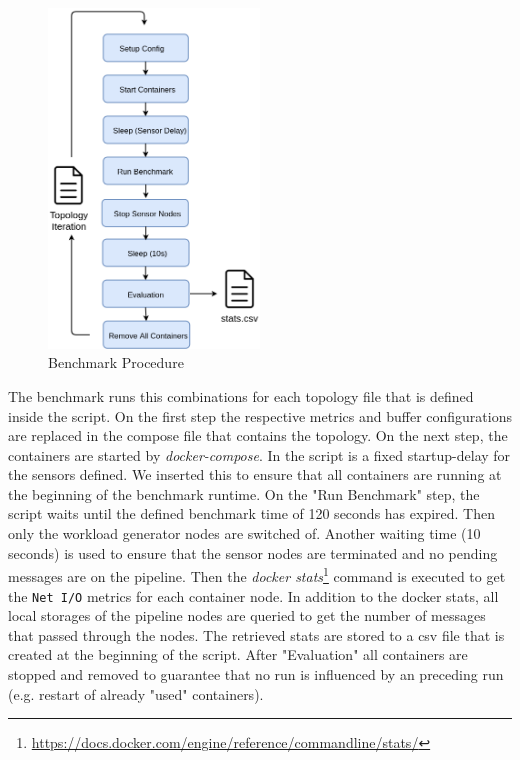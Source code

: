 \begin{figure}[H]
	\center
	\includegraphics[width=0.5\textwidth]{figures/dataoverheadsetup.png}
	\caption{Benchmark Procedure}
	\label{fig:benchmark}
\end{figure}

The benchmark runs this combinations for each topology file that is defined inside the script. On the first step the respective metrics and buffer configurations are replaced in the compose file that contains the topology.
On the next step, the containers are started by \emph{docker-compose}. In the script is a fixed startup-delay for the sensors defined. We inserted this to ensure that all containers are running at the beginning of the benchmark runtime. On the "Run Benchmark" step, the script waits until the defined benchmark time of 120 seconds has expired. Then only the workload generator nodes are switched of. Another waiting time (10 seconds) is used to ensure that the sensor nodes are terminated and no pending messages are on the pipeline. Then the \emph{docker stats}\footnote{\url{https://docs.docker.com/engine/reference/commandline/stats/}} command is executed to get the \texttt{Net I/O} metrics for each container node. In addition to the docker stats, all local storages of the pipeline nodes are queried to get the number of messages that passed through the nodes. The retrieved stats are stored to a csv file that is created at the beginning of the script.
After "Evaluation" all containers are stopped and removed to guarantee that no run is influenced by an preceding run (e.g. restart of already "used" containers).


